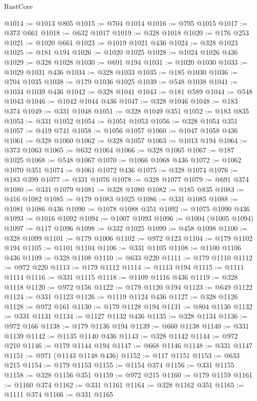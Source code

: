 \begin{lexlean}{RustCore}
\begin{coremodule}
@1014 := @1013 @805
@1015 := @704 @1014
@1016 := @795 @1015
@1017 := @373 @661
@1018 := @632 @1017
@1019 := @328 @1018
@1020 := @176 @253
@1021 := @1020 @661
@1023 := @1019 @1021 @436
@1024 := @328 @1023
@1025 := @181 @194
@1026 := @1020 @1025
@1028 := @1024 @1026 @436
@1029 := @328 @1028
@1030 := @691 @194
@1031 := @1020 @1030
@1033 := @1029 @1031 @436
@1034 := @328 @1033
@1035 := @185 @1030
@1036 := @704 @1035
@1038 := @179 @1036 @1025
@1039 := @548 @1038
@1041 := @1034 @1039 @436
@1042 := @328 @1041
@1043 := @181 @589
@1044 := @548 @1043
@1046 := @1042 @1044 @436
@1047 := @328 @1046
@1048 := @183 @374
@1049 := @331 @1048
@1051 := @328 @1049 @351
@1052 := @183 @835
@1053 := @331 @1052
@1054 := @1051 @1053
@1056 := @328 @1054 @351
@1057 := @419 @741
@1058 := @1056 @1057
@1060 := @1047 @1058 @436
@1061 := @328 @1060
@1062 := @328 @1057
@1063 := @1013 @194
@1064 := @373 @1063
@1065 := @632 @1064
@1066 := @328 @1065
@1067 := @187 @1025
@1068 := @548 @1067
@1070 := @1066 @1068 @436
@1072 := @1062 @1070 @351
@1074 := @1061 @1072 @436
@1075 := @328 @1074
@1076 := @183 @399
@1077 := @331 @1076
@1078 := @328 @1077
@1079 := @691 @374
@1080 := @331 @1079
@1081 := @328 @1080
@1082 := @185 @835
@1083 := @416 @1082
@1085 := @179 @1083 @1025
@1086 := @331 @1085
@1088 := @1081 @1086 @436
@1090 := @1078 @1088 @351
@1092 := @1075 @1090 @436
@1093 := @1016 @1092
@1094 := @1007 @1093
@1096 := @1004 (@1005 @1094)
@1097 := @117 @1096
@1098 := @332 @1025
@1099 := @458 @1098
@1100 := @328 @1099
@1101 := @179 @1006
@1102 := @972 @123
@1104 := @179 @1102 @194
@1105 := @1101 @1104
@1106 := @331 @1105
@1108 := @1100 @1106 @436
@1109 := @328 @1108
@1110 := @633 @220
@1111 := @179 @1110
@1112 := @972 @220
@1113 := @179 @1112
@1114 := @1113 @194
@1115 := @1111 @1114
@1116 := @331 @1115
@1118 := @1109 @1116 @436
@1119 := @328 @1118
@1120 := @972 @156
@1122 := @179 @1120 @194
@1123 := @649 @1122
@1124 := @331 @1123
@1126 := @1119 @1124 @436
@1127 := @328 @1126
@1128 := @972 @161
@1130 := @179 @1128 @194
@1131 := @804 @1130
@1132 := @331 @1131
@1134 := @1127 @1132 @436
@1135 := @328 @1134
@1136 := @972 @166
@1138 := @179 @1136 @194
@1139 := @660 @1138
@1140 := @331 @1139
@1142 := @1135 @1140 @436
@1143 := @328 @1142
@1144 := @972 @210
@1146 := @179 @1144 @194
@1147 := @668 @1146
@1148 := @331 @1147
@1151 := @971 (@1143 @1148 @436)
@1152 := @117 @1151
@1153 := @633 @215
@1154 := @179 @1153
@1155 := @1154 @374
@1156 := @331 @1155
@1158 := @328 @1156 @351
@1159 := @972 @215
@1160 := @179 @1159
@1161 := @1160 @374
@1162 := @331 @1161
@1164 := @328 @1162 @351
@1165 := @1111 @374
@1166 := @331 @1165

\end{coremodule}
\end{lexlean}
